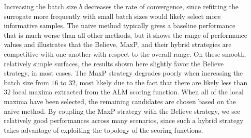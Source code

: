 Increasing the batch size $b$ decreases the rate of convergence, since refitting the surrogate more frequently with small batch sizes would likely select more informative samples.
%
The naive method typically gives a baseline performance that is much worse than all other methods, but it shows the range of performance values and illustrates that the Believe, MaxP, and their hybrid strategies are competitive with one another with respect to the overall range.
%
On these smooth, relatively simple surfaces, the results shown here slightly favor the Believe strategy, in most cases.
%
The MaxP strategy degrades poorly when increasing the batch size from $16$ to $32$, most likely due to the fact that there are likely less than $32$ local maxima extracted from the ALM scoring function.
%
When all of the local maxima have been selected, the remaining candidates are chosen based on the naive method.
%
By coupling the MaxP strategy with the Believe strategy, we see relatively good performances across many scenarios, since such a hybrid strategy takes advantage of exploiting the topology of the scoring functions.

